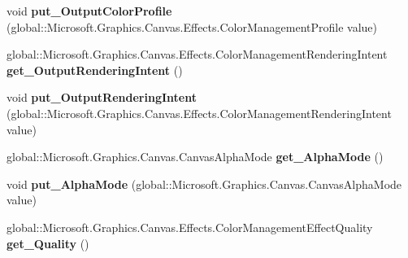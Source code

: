 \begin{DoxyCompactItemize}
void {\bfseries put\+\_\+\+Output\+Color\+Profile} (global\+::\+Microsoft.\+Graphics.\+Canvas.\+Effects.\+Color\+Management\+Profile value)
\item 
\mbox{\label{interface_microsoft_1_1_graphics_1_1_canvas_1_1_effects_1_1_i_color_management_effect_a1a0a5108efc4f507ad103a59c30284a8}} 
global\+::\+Microsoft.\+Graphics.\+Canvas.\+Effects.\+Color\+Management\+Rendering\+Intent {\bfseries get\+\_\+\+Output\+Rendering\+Intent} ()
\item 
\mbox{\label{interface_microsoft_1_1_graphics_1_1_canvas_1_1_effects_1_1_i_color_management_effect_ac8cbecd84f1efff87ca7977bdb11871b}} 
void {\bfseries put\+\_\+\+Output\+Rendering\+Intent} (global\+::\+Microsoft.\+Graphics.\+Canvas.\+Effects.\+Color\+Management\+Rendering\+Intent value)
\item 
\mbox{\label{interface_microsoft_1_1_graphics_1_1_canvas_1_1_effects_1_1_i_color_management_effect_a7d4117ceb7538a6087fe55cec1fe1dae}} 
global\+::\+Microsoft.\+Graphics.\+Canvas.\+Canvas\+Alpha\+Mode {\bfseries get\+\_\+\+Alpha\+Mode} ()
\item 
\mbox{\label{interface_microsoft_1_1_graphics_1_1_canvas_1_1_effects_1_1_i_color_management_effect_af51f08ac38859f62bfa6854da45d846e}} 
void {\bfseries put\+\_\+\+Alpha\+Mode} (global\+::\+Microsoft.\+Graphics.\+Canvas.\+Canvas\+Alpha\+Mode value)
\item 
\mbox{\label{interface_microsoft_1_1_graphics_1_1_canvas_1_1_effects_1_1_i_color_management_effect_a89c6320a78dd9ee2ea791a82ba659f20}} 
global\+::\+Microsoft.\+Graphics.\+Canvas.\+Effects.\+Color\+Management\+Effect\+Quality {\bfseries get\+\_\+\+Quality} ()
\item 
\mbox{\label{interface_microsoft_1_1_graphics_1_1_canvas_1_1_effects_1_1_i_color_management_effect_a447e32036c75c68edbb85d92ede18c3b}} 

\end{DoxyCompactItemize}
